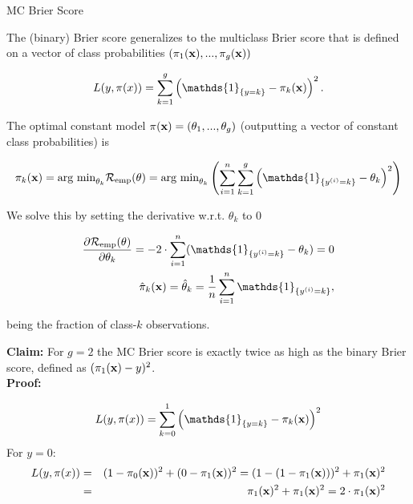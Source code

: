 \documentclass[11pt,compress,t,notes=noshow, xcolor=table]{beamer}
\begin{document}
\begin{vbframe}{MC Brier Score}

The (binary) Brier score generalizes to the multiclass Brier score that is defined on a vector of class probabilities $\left(\pi_1(\mathbf{x}), ..., \pi_g(\mathbf{x})\right)$

\begin{footnotesize}
$$
  L(y, \pi(x)) = \sum_{k = 1}^g \left(\mathds{1}_{\{y = k\}} - \pi_k(\xv)\right)^2.
$$
\end{footnotesize}

The optimal constant model $\pi(\mathbf{x}) = \left(\theta_1, ..., \theta_g\right)$ (outputting a vector of constant class probabilities) is  

\vspace*{-0.5cm}
\begin{footnotesize}
  \begin{eqnarray*}
    \pikx =\text{arg min}_{\theta_k} \riske(\theta) = \text{arg min}_{\theta_k} \left(\sumin \sum_{k = 1}^g \left(\mathds{1}_{\{\yi = k\}} - \theta_k\right)^2\right) 
      \end{eqnarray*}
      \end{footnotesize}
        We solve this by setting the derivative w.r.t. $\theta_k$ to 0
        \begin{footnotesize}
      \begin{eqnarray*}
      \frac{\partial \riske(\theta)}{\partial \theta_k} = - 2 \cdot \sumin (\mathds{1}_{\{\yi = k\}} - \theta_k) = 0 \\
    \pikxh = \thetah_k = \frac{1}{n} \sumin \mathds{1}_{\{\yi = k\}},   
    \end{eqnarray*}
\end{footnotesize}
being the fraction of class-$k$ observations. 

\framebreak

\textbf{Claim:} For $g = 2$ the MC Brier score is exactly twice as high as the binary Brier score, defined as $(\pi_1(\mathbf{x}) - y)^2$. \\
\lz
\textbf{Proof:}
\begin{footnotesize}
$$
  L(y, \pi(x)) = \sum_{k = 0}^1 \left(\mathds{1}_{\{y = k\}} - \pi_k(\xv)\right)^2
  $$
  For $y = 0$:
  \begin{eqnarray*}
  L(y, \pi(x)) &=& (1-\pi_0(\mathbf{x}))^2 + (0 - \pi_1(\mathbf{x}))^2  = (1-(1 - \pi_1(\mathbf{x})))^2 + \pi_1(\mathbf{x})^2 \\
  &=& \pi_1(\mathbf{x})^2 + \pi_1(\mathbf{x})^2 = 2 \cdot \pi_1(\mathbf{x})^2
  \end{eqnarray*}


\end{footnotesize}
\end{vbframe}
\end{document}
